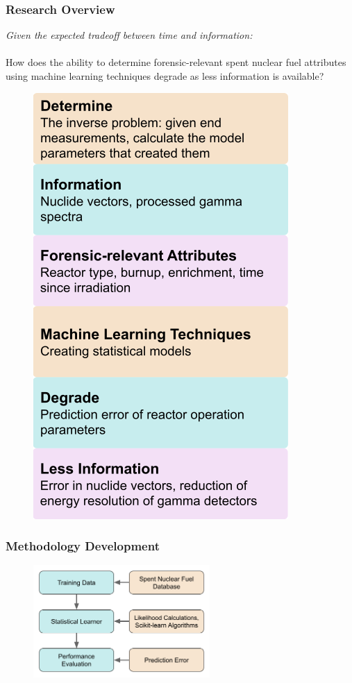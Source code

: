 
\begin{frame}
  \frametitle{Research Overview}
  \begin{adjustwidth}{-10pt}{-10pt}
  \begin{minipage}{0.6\textwidth}
    \textit{Given the expected tradeoff between time and information:} \\~\\
    How does the ability to determine forensic-relevant spent nuclear fuel
    attributes using machine learning techniques degrade as less information is
    available?
  \end{minipage}%
  \hfill
  \begin{minipage}{0.4\textwidth}
    \begin{figure}
      \centering
      \includegraphics[height=0.85\textheight]{./figures/overview.png}
    \end{figure}
  \end{minipage}
  \end{adjustwidth}
\end{frame}

\begin{frame}
  \frametitle{Methodology Development}
  \begin{figure}
    \centering
    \includegraphics[width=0.6\textwidth]{./figures/meth_pres.png}
  \end{figure}
\end{frame}


